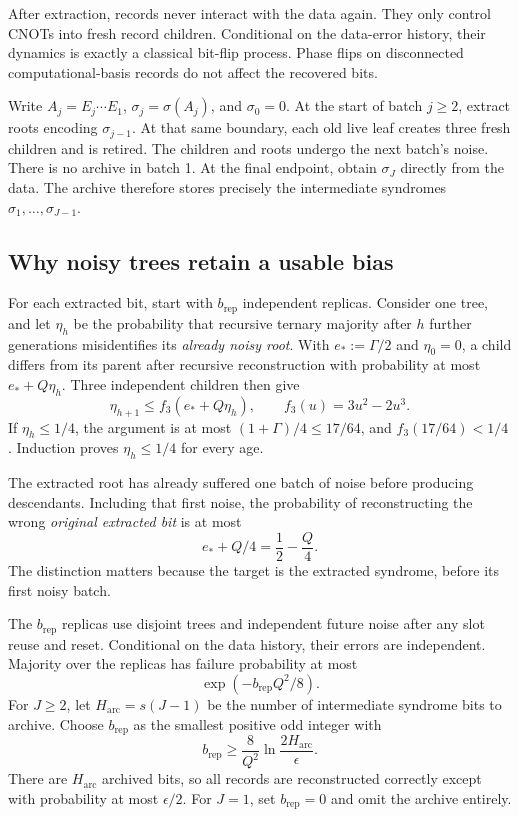 \documentclass[11pt,a4paper]{article}
\numberwithin{equation}{section}
\theoremstyle{remark}\newtheorem*{remark}{Interpretation}
\newcommand{\eps}{\epsilon}
\begin{document}
After extraction, records never interact with the data again. They only control CNOTs into fresh record children. Conditional on the data-error history, their dynamics is exactly a classical bit-flip process. Phase flips on disconnected computational-basis records do not affect the recovered bits.

Write $A_j=E_j\cdots E_1$, $\sigma_j=\sigma(A_j)$, and $\sigma_0=0$. At the start of batch $j\ge2$, extract roots encoding $\sigma_{j-1}$. At that same boundary, each old live leaf creates three fresh children and is retired. The children and roots undergo the next batch's noise. There is no archive in batch 1. At the final endpoint, obtain $\sigma_J$ directly from the data. The archive therefore stores precisely the intermediate syndromes $\sigma_1,\ldots,\sigma_{J-1}$.

\subsection{Why noisy trees retain a usable bias}
For each extracted bit, start with $b_{\mathrm{rep}}$ independent replicas. Consider one tree, and let $\eta_h$ be the probability that recursive ternary majority after $h$ further generations misidentifies its \emph{already noisy root}. With $e_*:=\Gamma/2$ and $\eta_0=0$, a child differs from its parent after recursive reconstruction with probability at most $e_*+Q\eta_h$. Three independent children then give
\begin{equation}
\eta_{h+1}\le f_3(e_*+Q\eta_h),\qquad
f_3(u)=3u^2-2u^3.
\end{equation}
If $\eta_h\le1/4$, the argument is at most $(1+\Gamma)/4\le17/64$, and $f_3(17/64)<1/4$. Induction proves $\eta_h\le1/4$ for every age.

The extracted root has already suffered one batch of noise before producing descendants. Including that first noise, the probability of reconstructing the wrong \emph{original extracted bit} is at most
\begin{equation}
e_*+Q/4=\frac12-\frac Q4.
\end{equation}
The distinction matters because the target is the extracted syndrome, before its first noisy batch.

The $b_{\mathrm{rep}}$ replicas use disjoint trees and independent future noise after any slot reuse and reset. Conditional on the data history, their errors are independent. Majority over the replicas has failure probability at most
\begin{equation}
\exp(-b_{\mathrm{rep}}Q^2/8).
\end{equation}
For $J\ge2$, let $H_{\mathrm{arc}}=s(J-1)$ be the number of intermediate syndrome bits to archive. Choose $b_{\mathrm{rep}}$ as the smallest positive odd integer with
\begin{equation}
b_{\mathrm{rep}}\ge\frac8{Q^2}\ln\frac{2H_{\mathrm{arc}}}\eps.
\end{equation}
There are $H_{\mathrm{arc}}$ archived bits, so all records are reconstructed correctly except with probability at most $\eps/2$. For $J=1$, set $b_{\mathrm{rep}}=0$ and omit the archive entirely.
\end{document}
